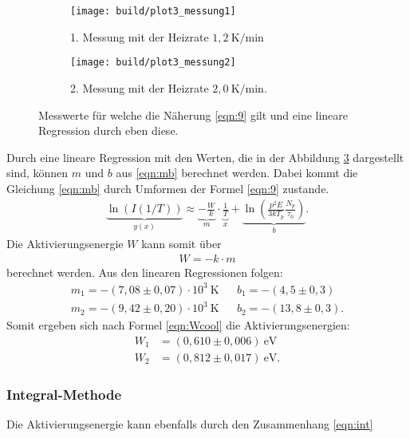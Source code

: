 \begin{figure}
  \centering
  \begin{subfigure}{0.49\textwidth}
    \centering
    \texttt{[image: build/plot3\_messung1]}
    \caption{1. Messung mit der Heizrate $1,2 \ \si{\kelvin\per\minute}$}
    \label{fig:logfit1}
  \end{subfigure}
  \begin{subfigure}{0.49\textwidth}
    \centering
    \texttt{[image: build/plot3\_messung2]}
    \caption{2. Messung mit der Heizrate $2,0 \ \si{\kelvin\per\minute}$.}
    \label{fig:logfit2}
  \end{subfigure}
\caption{Messwerte für welche
die Näherung \ref{eqn:9} gilt und eine lineare Regression durch eben diese.}
\label{fig:logfit}
\end{figure}
\FloatBarrier

Durch eine lineare Regression
mit den Werten, die in der Abbildung \ref{fig:logfit} dargestellt sind, können
$m$ und $b$ aus \eqref{eqn:mb} berechnet werden. Dabei kommt die Gleichung \eqref{eqn:mb}
durch Umformen der Formel \ref{eqn:9} zustande.
\begin{align}
  \underbrace{\ln(I(1/T))}_{y(x)}\approx \underbrace{-\frac{W}{k}}_{m}\cdot \underbrace{\frac1T}_{x}+\underbrace{\ln \left( \frac{p^2E}{3kT_p} \frac{N_p}{\tau_0}\right)}_{b}. \label{eqn:mb}
\end{align}
Die Aktivierungsenergie $W$ kann somit über
\begin{align}
  W=-k\cdot m \label{eqn:Wcool}
\end{align}
berechnet werden.
Aus den linearen Regressionen folgen:
\begin{align*}
  m_1=-(7,08\pm0,07)\cdot10^{3}\ \si{\kelvin}    &  &b_1=-(4,5\pm0,3)\\
  m_2=-(9,42\pm0,20)\cdot10^{3}\ \si{\kelvin}    &  &b_2=-(13,8\pm0,3).
\end{align*}
Somit ergeben sich nach Formel \eqref{eqn:Wcool} die Aktivierungsenergien:
\begin{align*}
  W_1&=(0,610\pm0,006)\ \si{\electronvolt}\\
  W_2&=(0,812\pm0,017)\ \si{\electronvolt}.
\end{align*}

\subsubsection{Integral-Methode}
\label{sec:integral}
Die Aktivierungsenergie kann ebenfalls durch den Zusammenhang \eqref{eqn:int}

